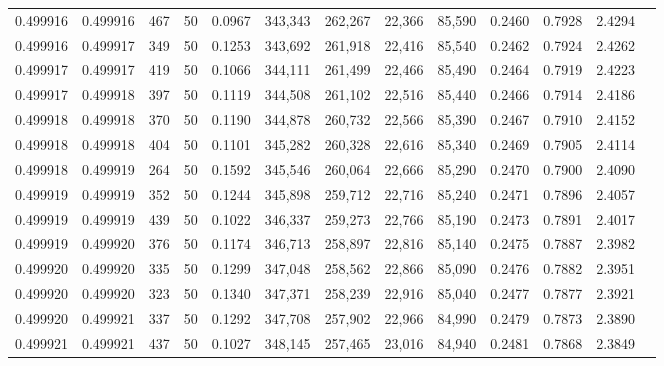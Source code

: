 \begin{tabular}{rrrrrrrrrrrrr}
0.499916 & 0.499916 &   467 &  50 &                                     0.0967 & 343,343 & 262,267 &  22,366 &  85,590 & 0.2460 & 0.7928 & 2.4294 \\
0.499916 & 0.499917 &   349 &  50 &                                     0.1253 & 343,692 & 261,918 &  22,416 &  85,540 & 0.2462 & 0.7924 & 2.4262 \\
0.499917 & 0.499917 &   419 &  50 &                                     0.1066 & 344,111 & 261,499 &  22,466 &  85,490 & 0.2464 & 0.7919 & 2.4223 \\
0.499917 & 0.499918 &   397 &  50 &                                     0.1119 & 344,508 & 261,102 &  22,516 &  85,440 & 0.2466 & 0.7914 & 2.4186 \\
0.499918 & 0.499918 &   370 &  50 &                                     0.1190 & 344,878 & 260,732 &  22,566 &  85,390 & 0.2467 & 0.7910 & 2.4152 \\
0.499918 & 0.499918 &   404 &  50 &                                     0.1101 & 345,282 & 260,328 &  22,616 &  85,340 & 0.2469 & 0.7905 & 2.4114 \\
0.499918 & 0.499919 &   264 &  50 &                                     0.1592 & 345,546 & 260,064 &  22,666 &  85,290 & 0.2470 & 0.7900 & 2.4090 \\
0.499919 & 0.499919 &   352 &  50 &                                     0.1244 & 345,898 & 259,712 &  22,716 &  85,240 & 0.2471 & 0.7896 & 2.4057 \\
0.499919 & 0.499919 &   439 &  50 &                                     0.1022 & 346,337 & 259,273 &  22,766 &  85,190 & 0.2473 & 0.7891 & 2.4017 \\
0.499919 & 0.499920 &   376 &  50 &                                     0.1174 & 346,713 & 258,897 &  22,816 &  85,140 & 0.2475 & 0.7887 & 2.3982 \\
0.499920 & 0.499920 &   335 &  50 &                                     0.1299 & 347,048 & 258,562 &  22,866 &  85,090 & 0.2476 & 0.7882 & 2.3951 \\
0.499920 & 0.499920 &   323 &  50 &                                     0.1340 & 347,371 & 258,239 &  22,916 &  85,040 & 0.2477 & 0.7877 & 2.3921 \\
0.499920 & 0.499921 &   337 &  50 &                                     0.1292 & 347,708 & 257,902 &  22,966 &  84,990 & 0.2479 & 0.7873 & 2.3890 \\
0.499921 & 0.499921 &   437 &  50 &                                     0.1027 & 348,145 & 257,465 &  23,016 &  84,940 & 0.2481 & 0.7868 & 2.3849 \\

\end{tabular}
